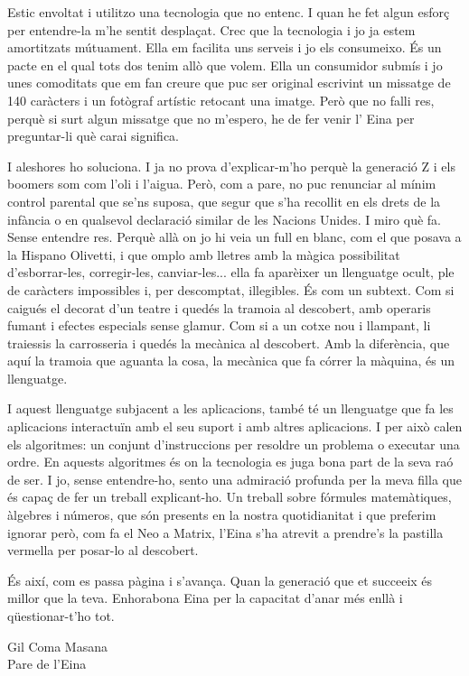 Estic envoltat i utilitzo una tecnologia que no entenc. I quan he fet algun esforç per entendre-la m'he sentit desplaçat. Crec que la tecnologia i jo ja estem amortitzats mútuament. Ella em facilita uns serveis i jo els consumeixo. És un pacte en el qual tots dos tenim allò que volem. Ella un consumidor submís i jo unes comoditats que em fan creure que puc ser original escrivint un missatge de 140 caràcters i un fotògraf artístic retocant una imatge. Però que no falli res, perquè si surt algun missatge que no m'espero, he de fer venir l' Eina per preguntar-li què carai significa.

I aleshores ho soluciona. I ja no prova d'explicar-m'ho perquè la generació Z i els boomers som com l'oli i l'aigua. Però, com a pare, no puc renunciar al mínim control parental que se'ns suposa, que segur que s'ha recollit en els drets de la infància o en qualsevol declaració similar de les Nacions Unides. I miro què fa. Sense entendre res. Perquè allà on jo hi veia un full en blanc, com el que posava a la Hispano Olivetti, i que omplo amb lletres amb la màgica possibilitat d'esborrar-les, corregir-les, canviar-les... ella fa aparèixer un llenguatge ocult, ple de caràcters impossibles i, per descomptat, illegibles. És com un subtext. Com si caigués el decorat d'un teatre i quedés la tramoia al descobert, amb operaris fumant i efectes especials sense glamur. Com si a un cotxe nou i llampant, li traiessis la carrosseria i quedés la mecànica al descobert. Amb la diferència, que aquí la tramoia que aguanta la cosa, la mecànica que fa córrer la màquina, és un llenguatge.

I aquest llenguatge subjacent a les aplicacions, també té un llenguatge que fa les aplicacions interactuïn amb el seu suport i amb altres aplicacions. I per això calen els algoritmes: un conjunt d'instruccions per resoldre un problema o executar una ordre. En aquests algoritmes és on la tecnologia es juga bona part de la seva raó de ser. I jo, sense entendre-ho, sento una admiració profunda per la meva filla que és capaç de fer un treball explicant-ho. Un treball sobre fórmules matemàtiques, àlgebres i números, que són presents en la nostra quotidianitat i que preferim ignorar però, com fa el Neo a Matrix, l'Eina s'ha atrevit a prendre's la pastilla vermella per posar-lo al descobert. 

És així, com es passa pàgina i s'avança. Quan la generació que et succeeix és millor que la teva. Enhorabona Eina per la capacitat d'anar més enllà i qüestionar-t'ho tot.

\begin{flushright}
	Gil Coma Masana \\ Pare de l'Eina
\end{flushright}